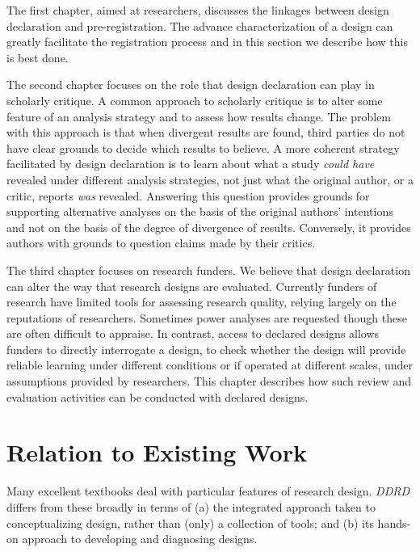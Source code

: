 \documentclass[11pt]{article}
\begin{document}
The first chapter, aimed at researchers, discusses the linkages between design declaration and pre-registration. The advance characterization of a design can greatly facilitate the registration process and in this section we describe how this is best done. 

The second chapter focuses on the role that design declaration can play in scholarly critique. A common approach to scholarly critique is to alter some feature of an analysis strategy and to assess how results change. The problem with this approach is that when divergent results are found, third parties do not have clear grounds to decide which results to believe. A more coherent strategy facilitated by design declaration is to learn about what a study {\it could have} revealed under different analysis strategies, not just what the original author, or a critic, reports {\it was} revealed. Answering this question provides grounds for supporting alternative analyses on the basis of the original authors' intentions and not on the basis of the degree of divergence of results. Conversely, it provides authors with grounds to question claims made by their critics. 

The third chapter focuses on research funders. We believe that design declaration can alter the way that research designs are evaluated. Currently funders of research have limited tools for assessing  research quality, relying largely on the reputations of researchers. Sometimes power analyses are requested though these are often difficult to appraise. In contrast, access to declared designs allows funders to directly interrogate a design, to check whether the design will provide reliable learning under different conditions or if operated at different scales, under assumptions provided by researchers. This chapter describes how such review and evaluation activities can be conducted with declared designs.

\section{Relation to Existing Work}

Many excellent textbooks deal with particular features of research design. \textit{DDRD} differs from these broadly in terms of (a) the integrated approach taken to conceptualizing design, rather than (only) a collection of tools; and (b) its hands-on approach to developing and diagnosing designs.
\end{document}
